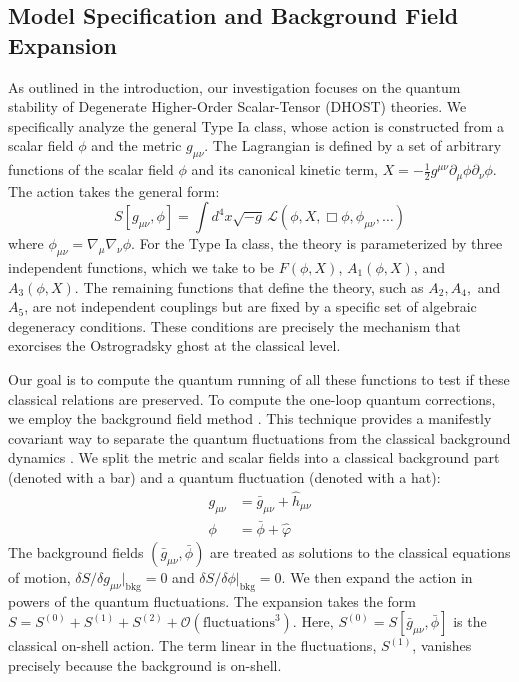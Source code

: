 \documentclass[twocolumn]{aastex631}
\begin{document}
\subsection{Model Specification and Background Field Expansion}
As outlined in the introduction, our investigation focuses on the quantum stability of Degenerate Higher-Order Scalar-Tensor (DHOST) theories. We specifically analyze the general Type Ia class, whose action is constructed from a scalar field $\phi$ and the metric $g_{\mu\nu}$. The Lagrangian is defined by a set of arbitrary functions of the scalar field $\phi$ and its canonical kinetic term, $X = - \frac{1}{2} g^{\mu\nu} \partial_\mu\phi \partial_\nu\phi$. The action takes the general form:
\begin{equation}S[g_{\mu\nu}, \phi] = \int d^4x \sqrt{-g} \, \mathcal{L}(\phi, X, \Box\phi, \phi_{\mu\nu}, \dots)\end{equation}
where $\phi_{\mu\nu} = \nabla_\mu \nabla_\nu \phi$. For the Type Ia class, the theory is parameterized by three independent functions, which we take to be $F(\phi, X)$, $A_1(\phi, X)$, and $A_3(\phi, X)$. The remaining functions that define the theory, such as $A_2, A_4,$ and $A_5$, are not independent couplings but are fixed by a specific set of algebraic degeneracy conditions. These conditions are precisely the mechanism that exorcises the Ostrogradsky ghost at the classical level.

Our goal is to compute the quantum running of all these functions to test if these classical relations are preserved. \citep{ballardini2022typeiasupernovaedata}
To compute the one-loop quantum corrections, we employ the background field method \citep{chen1995differentialrenormalizationscalarfield,buchbinder1997backgroundfieldmethodn}. This technique provides a manifestly covariant way to separate the quantum fluctuations from the classical background dynamics \citep{buchbinder1997backgroundfieldmethodn}. We split the metric and scalar fields into a classical background part (denoted with a bar) and a quantum fluctuation (denoted with a hat):
\begin{align}g_{\mu\nu} &= \bar{g}_{\mu\nu} + \hat{h}_{\mu\nu} \\\phi &= \bar{\phi} + \hat{\varphi}\end{align}
The background fields $(\bar{g}_{\mu\nu}, \bar{\phi})$ are treated as solutions to the classical equations of motion, $\delta S / \delta g_{\mu\nu}|_{\text{bkg}} = 0$ and $\delta S / \delta \phi|_{\text{bkg}} = 0$. We then expand the action in powers of the quantum fluctuations. The expansion takes the form $S = S^{(0)} + S^{(1)} + S^{(2)} + \mathcal{O}(\text{fluctuations}^3)$. Here, $S^{(0)} = S[\bar{g}_{\mu\nu}, \bar{\phi}]$ is the classical on-shell action. The term linear in the fluctuations, $S^{(1)}$, vanishes precisely because the background is on-shell.
\end{document}

